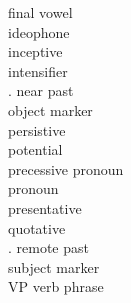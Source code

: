 \documentclass[output=paper]{langscibook}
\begin{document}
\begin{multicols}{2}
\begin{tabbing}
\FV{} \> final vowel\\
\IDEO{} \> ideophone\\
\INCP{} \> inceptive\\
\INT{} \> intensifier\\
\N.\PST{} \> near past\\
\OM{} \> object marker\\
\PERS{} \> persistive\\
\POT{} \> potential\\
\PRCS{} \> precessive pronoun\\
\PRO{} \> pronoun\\
\PRSNT{} \> presentative\\
\QUOT{} \> quotative\\
\RMT.\PST{} \> remote past\\
\SM{} \> subject marker\\
VP \> verb phrase 
\end{tabbing}
\end{multicols}

\sloppy\printbibliography[heading=subbibliography,notkeyword=this]
\end{document}
